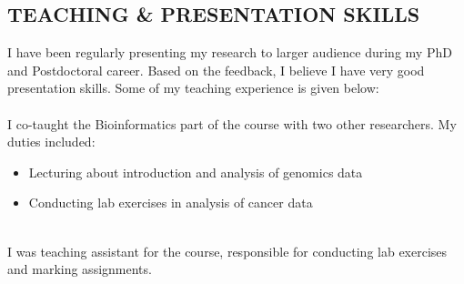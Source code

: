 \documentclass[margin, 10pt]{res} %
\begin{document}
\begin{resume}
\section{TEACHING \& PRESENTATION SKILLS}
I have been regularly presenting my research to larger audience during my PhD and Postdoctoral career. Based on the feedback, I believe I have very good presentation skills. Some of my teaching experience is given below: \\

{\bf \color{Brown}{Molecular Oncology and Biostatistics, 2017}} \\
I co-taught the Bioinformatics part of the course with two other researchers. My duties included: 
\begin{itemize} 
\item Lecturing about introduction and analysis of genomics data 
\item Conducting lab exercises in analysis of cancer data
\end{itemize} 
{\bf \color{Brown}{Advanced Software Engineering, 2008}} \\
I was teaching assistant for the course, responsible for conducting lab exercises and marking assignments.



\end{resume}
\end{document}
